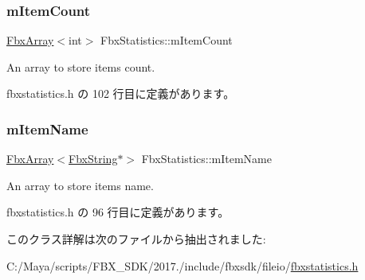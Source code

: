 \subsubsection{\texorpdfstring{m\+Item\+Count}{mItemCount}}
{\footnotesize\ttfamily \hyperlink{class_fbx_array}{Fbx\+Array}$<$int$>$ Fbx\+Statistics\+::m\+Item\+Count\hspace{0.3cm}{\ttfamily [protected]}}



An array to store item\textquotesingle{}s count. 



 fbxstatistics.\+h の 102 行目に定義があります。

\mbox{\label{class_fbx_statistics_a91d987cd85cf3e567b9c309c9389f02d}} 
\subsubsection{\texorpdfstring{m\+Item\+Name}{mItemName}}
{\footnotesize\ttfamily \hyperlink{class_fbx_array}{Fbx\+Array}$<$\hyperlink{class_fbx_string}{Fbx\+String}$\ast$$>$ Fbx\+Statistics\+::m\+Item\+Name\hspace{0.3cm}{\ttfamily [protected]}}



An array to store item\textquotesingle{}s name. 



 fbxstatistics.\+h の 96 行目に定義があります。



このクラス詳解は次のファイルから抽出されました\+:\begin{DoxyCompactItemize}
\item 
C\+:/\+Maya/scripts/\+F\+B\+X\+\_\+\+S\+D\+K/2017./include/fbxsdk/fileio/\hyperlink{fbxstatistics_8h}{fbxstatistics.\+h}\end{DoxyCompactItemize}
